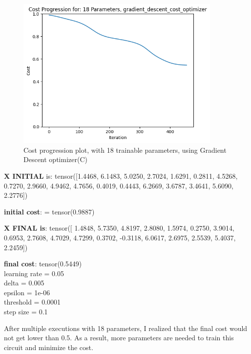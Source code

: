 \documentclass[inscr,ack,preface]{diphdthesis}
\begin{document}
\begin{enumerate}[label=\textbf{\Alph*.}]
\begin{figure}[H]
\begin{center}
    \includegraphics[width=0.9\textwidth]{epsilon06/18.png}
    \caption{Cost progression plot, with 18 trainable parameters, using Gradient Descent optimizer(C)} 
    \label{fig:enter-label}
    \end{center}
\end{figure}

\textbf{X INITIAL} is:
 tensor([1.4468, 6.1483, 5.0250, 2.7024, 1.6291, 0.2811, 4.5268, 0.7270, 2.9660,
        4.9462, 4.7656, 0.4019, 0.4443, 6.2669, 3.6787, 3.4641, 5.6090, 2.2776])
        
\textbf{initial cost}: = tensor(0.9887)

\textbf{X FINAL is}:
tensor([ 1.4848,  5.7350,  4.8197,  2.8080,  1.5974,  0.2750,  3.9014,  0.6953,
         2.7608,  4.7029,  4.7299,  0.3702, -0.3118,  6.0617,  2.6975,  2.5539,
         5.4037,  2.2459])

\textbf{final cost}: tensor(0.5449)\\

learning rate =  0.05 \\
delta =  0.005 \\
epsilon =  1e-06 \\
threshold =  0.0001\\
step size =  0.1 \\

\end{enumerate}

After multiple executions with 18 parameters, I realized that the final cost would not get lower than 0.5. As a result, more parameters are needed to train this circuit and minimize the cost. 
\end{document}
